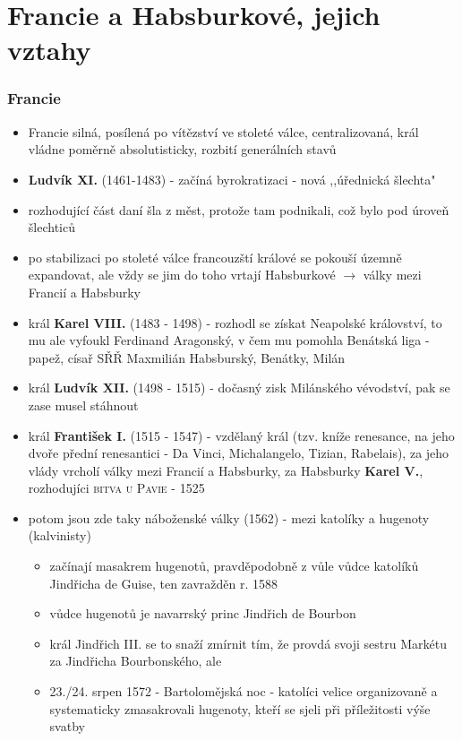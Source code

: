 \documentclass{article}
\begin{document}
\part{Francie a Habsburkové, jejich vztahy}
\section{Francie}
\begin{itemize}
  \item Francie silná, posílená po vítězství ve stoleté válce, centralizovaná, král vládne poměrně absolutisticky, rozbití generálních stavů
  \item \textbf{Ludvík XI.} (1461-1483) - začíná byrokratizaci - nová ,,úřednická šlechta"
  \item rozhodující část daní šla z měst, protože tam podnikali, což bylo pod úroveň šlechticů
  \item po stabilizaci po stoleté válce francouzští králové se pokouší územně expandovat, ale vždy se jim do toho vrtají Habsburkové $\rightarrow$ války mezi Francií a Habsburky
  \item král \textbf{Karel VIII.} (1483 - 1498) - rozhodl se získat Neapolské království, to mu ale vyfoukl Ferdinand Aragonský, v čem mu pomohla Benátská liga - papež, císař SŘŘ Maxmilián Habsburský, Benátky, Milán
  \item král \textbf{Ludvík XII.} (1498 - 1515) - dočasný zisk Milánského vévodství, pak se zase musel stáhnout
  \item král \textbf{František I.} (1515 - 1547) - vzdělaný král (tzv. kníže renesance, na jeho dvoře přední renesantici - Da Vinci, Michalangelo, Tizian, Rabelais), za jeho vlády vrcholí války mezi Francií a Habsburky, za Habsburky \textbf{Karel V.}, rozhodujíci \textsc{bitva u Pavie} - 1525
  \item potom jsou zde taky náboženské války (1562) - mezi katolíky a hugenoty (kalvinisty)
  \begin{itemize}
    \item začínají masakrem hugenotů, pravděpodobně z vůle vůdce katolíků Jindřicha de Guise, ten zavražděn r. 1588
    \item vůdce hugenotů je navarrský princ Jindřich de Bourbon
    \item král Jindřich III. se to snaží zmírnit tím, že provdá svoji sestru Markétu za Jindřicha Bourbonského, ale
    \item 23./24. srpen 1572 - Bartolomějská noc - katolíci velice organizovaně a systematicky zmasakrovali hugenoty, kteří se sjeli při příležitosti výše svatby

\end{itemize}
\end{itemize}
\end{document}
